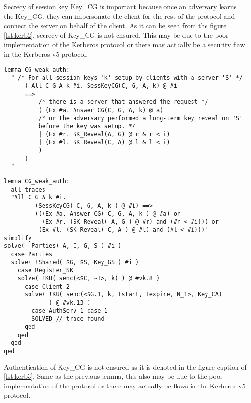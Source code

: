\documentclass[a4paper, 12pt, titlepage]{article}
\begin{document}
Secrecy of session key Key\_CG is important because once an adversary learns the Key\_CG, they can impersonate the client for the rest of the protocol and connect the server on behalf of the client. As it can be seen from the figure \ref{lst:kerb2}, secrecy of Key\_CG is not ensured. This may be due to the poor implementation of the Kerberos protocol or there may actually be a security flaw in the Kerberos v5 protocol.
\begin{lstlisting}[caption = Implementation of weak authentication lemma of Kerberos v5 protocol]
lemma CG_weak_auth:
  " /* For all session keys 'k' setup by clients with a server 'S' */
	  ( All C G A k #i. SessKeyCG(C, G, A, k) @ #i
	  ==>
		  /* there is a server that answered the request */
		  ( (Ex #a. Answer_CG(C, G, A, k) @ a)
		  /* or the adversary performed a long-term key reveal on 'S'
		  before the key was setup. */
		  | (Ex #r. SK_Reveal(A, G) @ r & r < i)
		  | (Ex #l. SK_Reveal(C, A) @ l & l < i)
		  )
	  )
  "
\end{lstlisting}
\begin{lstlisting}[caption = Execution results are negative for weak authentication lemma of Kerberos v5 protocol, label = {lst:kerb3}]
lemma CG_weak_auth:
  all-traces
  "All C G A k #i.
         (SessKeyCG( C, G, A, k ) @ #i) ==>
         (((Ex #a. Answer_CG( C, G, A, k ) @ #a) or
           (Ex #r. (SK_Reveal( A, G ) @ #r) and (#r < #i))) or
          (Ex #l. (SK_Reveal( C, A ) @ #l) and (#l < #i)))"
simplify
solve( !Parties( A, C, G, S ) #i )
  case Parties
  solve( !Shared( $G, $S, Key_GS ) #i )
    case Register_SK
    solve( !KU( senc(<$C, ~T>, k) ) @ #vk.8 )
      case Client_2
      solve( !KU( senc(<$G.1, k, Tstart, Texpire, N_1>, Key_CA)
             ) @ #vk.13 )
        case AuthServ_1_case_1
        SOLVED // trace found
      qed
    qed
  qed
qed
\end{lstlisting}
Authentication of Key\_CG is not ensured as it is denoted in the figure caption of \ref{lst:kerb3}. Same as the previous lemma, this also may be due to the poor implementation of the protocol or there may actually be flaws in the Kerberos v5 protocol.
\end{document}
